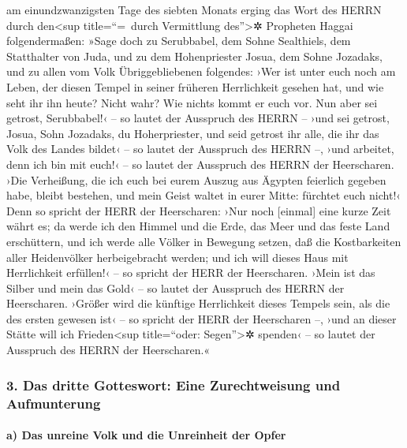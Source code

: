  am einundzwanzigsten Tage des siebten Monats erging das
Wort des HERRN durch den\textless sup title=``=~durch Vermittlung
des''\textgreater✲ Propheten Haggai folgendermaßen:  »Sage
doch zu Serubbabel, dem Sohne Sealthiels, dem Statthalter von Juda, und
zu dem Hohenpriester Josua, dem Sohne Jozadaks, und zu allen vom Volk
Übriggebliebenen folgendes:  ›Wer ist unter euch noch am
Leben, der diesen Tempel in seiner früheren Herrlichkeit gesehen hat,
und wie seht ihr ihn heute? Nicht wahr? Wie nichts kommt er euch vor.
 Nun aber sei getrost, Serubbabel!‹ -- so lautet der
Ausspruch des HERRN -- ›und sei getrost, Josua, Sohn Jozadaks, du
Hoherpriester, und seid getrost ihr alle, die ihr das Volk des Landes
bildet‹ -- so lautet der Ausspruch des HERRN --, ›und arbeitet, denn ich
bin mit euch!‹ -- so lautet der Ausspruch des HERRN der Heerscharen.
 ›Die Verheißung, die ich euch bei eurem Auszug aus
Ägypten feierlich gegeben habe, bleibt bestehen, und mein Geist waltet
in eurer Mitte: fürchtet euch nicht!‹  Denn so spricht der
HERR der Heerscharen: ›Nur noch {[}einmal{]} eine kurze Zeit währt es;
da werde ich den Himmel und die Erde, das Meer und das feste Land
erschüttern,  und ich werde alle Völker in Bewegung
setzen, daß die Kostbarkeiten aller Heidenvölker herbeigebracht werden;
und ich will dieses Haus mit Herrlichkeit erfüllen!‹ -- so spricht der
HERR der Heerscharen.  ›Mein ist das Silber und mein das
Gold‹ -- so lautet der Ausspruch des HERRN der Heerscharen.
 ›Größer wird die künftige Herrlichkeit dieses Tempels
sein, als die des ersten gewesen ist‹ -- so spricht der HERR der
Heerscharen --, ›und an dieser Stätte will ich Frieden\textless sup
title=``oder: Segen''\textgreater✲ spenden‹ -- so lautet der Ausspruch
des HERRN der Heerscharen.«

\hypertarget{das-dritte-gotteswort-eine-zurechtweisung-und-aufmunterung}{%
\subsubsection{3. Das dritte Gotteswort: Eine Zurechtweisung und
Aufmunterung}\label{das-dritte-gotteswort-eine-zurechtweisung-und-aufmunterung}}

\hypertarget{a-das-unreine-volk-und-die-unreinheit-der-opfer}{%
\paragraph{a) Das unreine Volk und die Unreinheit der
Opfer}\label{a-das-unreine-volk-und-die-unreinheit-der-opfer}}

